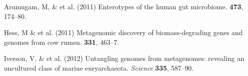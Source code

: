 \documentclass{pnastwo}
\begin{document}
\begin{article}
\begin{thebibliography}{10}

 Arumugam, M, \& et al. \newblock (2011) Enterotypes of
the human gut microbiome.  {\bf 473}, 174--80.


 Hess, M \& et al. \newblock
(2011) Metagenomic discovery of biomass-degrading genes and genomes from cow
rumen.  {\bf 331}, 463--7.



 Iverson, V, \& et al. \newblock (2012) Untangling genomes from
metagenomes: revealing an uncultured class of marine euryarchaeota. \newblock
{\em Science} {\bf 335}, 587--90.




\end{thebibliography}
\end{article}
\end{document}
